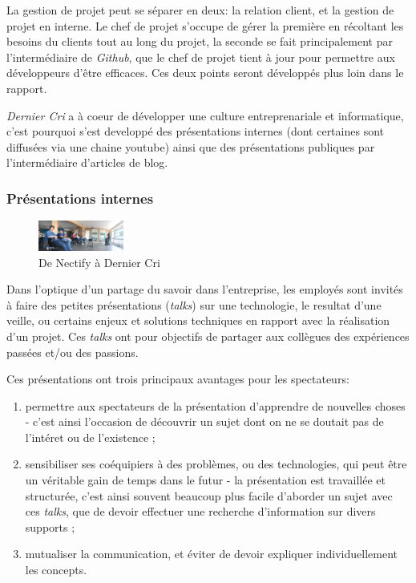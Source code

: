\bigskip

La gestion de projet peut se séparer en deux: la relation client, et la
gestion de projet en interne. Le chef de projet s'occupe de gérer la
première en récoltant les besoins du clients tout au long du projet, la
seconde se fait principalement par l'intermédiaire de \emph{Github}, que
le chef de projet tient à jour pour permettre aux développeurs d'être
efficaces. Ces deux points seront développés plus loin dans le rapport.

\bigskip

\emph{Dernier Cri} a à coeur de développer une culture entreprenariale
et informatique, c'est pourquoi s'est developpé des présentations
internes (dont certaines sont diffusées via une chaine youtube) ainsi
que des présentations publiques par l'intermédiaire d'articles de blog.

\subsubsection{Présentations internes}\label{pruxe9sentations-internes}

\begin{figure}[h]
  \centering
  \includegraphics[height=1cm]{figures/talk.jpg}
  \caption{De Nectify à Dernier Cri}
\end{figure}

\bigskip

Dans l'optique d'un partage du savoir dans l'entreprise, les employés
sont invités à faire des petites présentations (\emph{talks}) sur une
technologie, le resultat d'une veille, ou certains enjeux et solutions
techniques en rapport avec la réalisation d'un projet. Ces \emph{talks}
ont pour objectifs de partager aux collègues des expériences passées
et/ou des passions.

\bigskip

Ces présentations ont trois principaux avantages pour les spectateurs:

\begin{enumerate}
\def\labelenumi{\arabic{enumi}.}
\tightlist
\item
  permettre aux spectateurs de la présentation d'apprendre de nouvelles
  choses - c'est ainsi l'occasion de découvrir un sujet dont on ne se
  doutait pas de l'intéret ou de l'existence ;\\
\item
  sensibiliser ses coéquipiers à des problèmes, ou des technologies, qui
  peut être un véritable gain de temps dans le futur - la présentation
  est travaillée et structurée, c'est ainsi souvent beaucoup plus facile
  d'aborder un sujet avec ces \emph{talks}, que de devoir effectuer une
  recherche d'information sur divers supports ;\\
\item
  mutualiser la communication, et éviter de devoir expliquer
  individuellement les concepts.
\end{enumerate}

